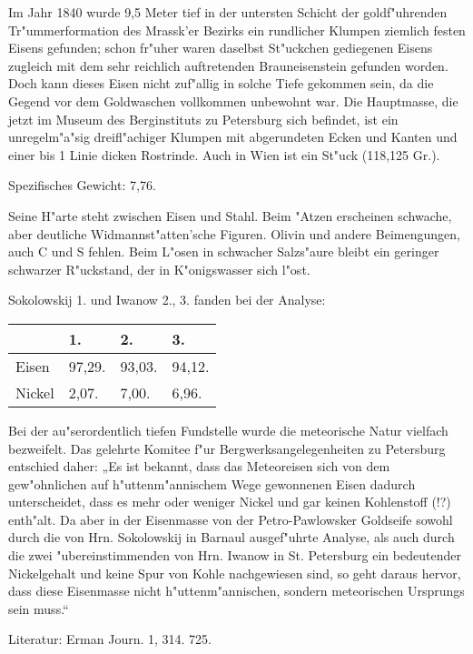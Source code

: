 \documentclass[a4paper, 11pt, oneside]{article}
\begin{document}
Im Jahr 1840 wurde 9,5 Meter tief in der untersten Schicht der goldf"uhrenden Tr"ummerformation des Mrassk'er Bezirks ein rundlicher Klumpen ziemlich festen Eisens gefunden; schon fr"uher waren daselbst St"uckchen gediegenen Eisens zugleich mit dem sehr reichlich auftretenden Brauneisenstein gefunden worden. Doch kann dieses Eisen nicht zuf"allig in solche Tiefe gekommen sein, da die Gegend vor dem Goldwaschen vollkommen unbewohnt war. Die Hauptmasse, die jetzt im Museum des Berginstituts zu Petersburg sich befindet, ist ein unregelm"a"sig dreifl"achiger Klumpen mit abgerundeten Ecken und Kanten und einer bis 1 Linie dicken Rostrinde. Auch in Wien ist ein St"uck (118,125 Gr.).

Spezifisches Gewicht: 7,76.

Seine H"arte steht zwischen Eisen und Stahl. Beim "Atzen erscheinen schwache, aber deutliche Widmannst"atten'sche Figuren. Olivin und andere Beimengungen, auch C und S fehlen. Beim L"osen in schwacher Salzs"aure bleibt ein geringer schwarzer R"uckstand, der in K"onigswasser sich l"ost.

Sokolowskij 1. und Iwanow 2., 3. fanden bei der Analyse:
\begin{table}[H]
    \centering
    \begin{tabular}{l l l l}
         & 1. & 2. & 3. \\ \hline
        Eisen & 97,29. & 93,03. & 94,12. \\
        Nickel & 2,07. & 7,00. & 6,96. \\
    \end{tabular}
\end{table}

Bei der au"serordentlich tiefen Fundstelle wurde die meteorische Natur vielfach bezweifelt. Das gelehrte Komitee f"ur Bergwerksangelegenheiten zu Petersburg entschied daher: „Es ist bekannt, dass das Meteoreisen sich von dem gew"ohnlichen auf h"uttenm"annischem Wege gewonnenen Eisen dadurch unterscheidet, dass es mehr oder weniger Nickel und gar keinen Kohlenstoff (!?) enth"alt. Da aber in der Eisenmasse von der Petro-Pawlowsker Goldseife sowohl durch die von Hrn. Sokolowskij in Barnaul ausgef"uhrte Analyse, als auch durch die zwei "ubereinstimmenden von Hrn. Iwanow in St. Petersburg ein bedeutender Nickelgehalt und keine Spur von Kohle nachgewiesen sind, so geht daraus hervor, dass diese Eisenmasse nicht h"uttenm"annischen, sondern meteorischen Ursprungs sein muss.“

\footnotesize
Literatur: Erman Journ. 1, 314. 725.
\end{document}
